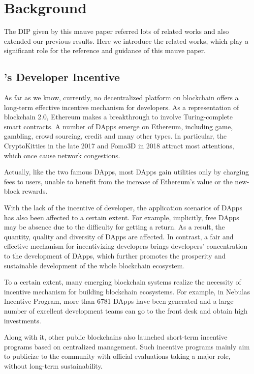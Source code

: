 \section{Background}
\label{sec:background}
The DIP given by this mauve paper referred  lots of related works and also extended our previous results. Here we introduce the related works, which play a significant role for the  reference and guidance of this mauve paper.

\subsection{\dapp's Developer Incentive}
As far as we know, currently, no decentralized platform on blockchain offers a long-term effective incentive mechanism for \dapp developers. As a representation of blockchain 2.0, Ethereum makes a breakthrough to involve Turing-complete smart contracts. A number of DApps emerge on Ethereum, including game, gambling, crowd sourcing, credit and many other types. In particular, the CryptoKitties in the late 2017 and Fomo3D in 2018 attract most attentions, which once cause network congestions.

Actually, like the two famous DApps, most DApps gain utilities only by charging
fees to users, unable to benefit from the increase of Ethereum's value or the
new-block rewards.

With the lack of the incentive of developer, the application scenarios of DApps
has also been affected to a certain extent. For example, implicitly, free DApps
may be absence due to the difficulty for getting a return. As a result, the
quantity, quality and diversity of DApps are affected. In contrast, a fair and
effective mechanism for incentivizing developers brings developers'
concentration to the development of DApps, which further promotes the prosperity and sustainable development of the whole blockchain ecosystem.

To a certain extent, many emerging blockchain systems realize the necessity of incentive mechanism for building blockchain ecosystems. For example, in Nebulas Incentive Program, more than 6781 DApps have been generated and a large number of excellent development teams can go to the front desk and obtain high investments.

Along with it, other public blockchains also launched short-term incentive programs based on centralized management. Such incentive programs mainly aim to publicize to the community with official evaluations taking a major role, without long-term sustainability.


